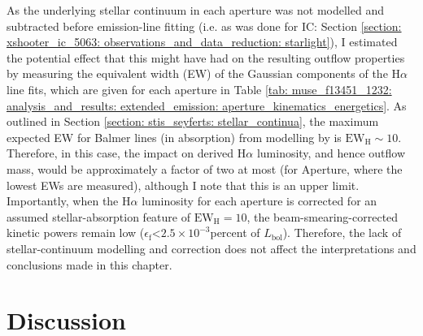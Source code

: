 As the underlying stellar continuum in each aperture was not modelled and subtracted before emission-line fitting (i.e. as was done for IC: Section \ref{section: xshooter_ic_5063: observations_and_data_reduction: starlight}), I estimated the potential effect that this might have had on the resulting outflow properties by measuring the equivalent width (EW) of the Gaussian components of the H$\alpha$ line fits, which are given for each aperture in Table \ref{tab: muse_f13451_1232: analysis_and_results: extended_emission: aperture_kinematics_energetics}. As outlined in Section \ref{section: stis_seyferts: stellar_continua}, the maximum expected EW for Balmer lines (in absorption) from modelling by \citet{GonzalezDelgado1999} is $\mathrm{EW}_\mathrm{H}\sim10$\;{\AA}. Therefore, in this case, the impact on derived H$\alpha$ luminosity, and hence outflow mass, would be approximately a factor of two at most (for Aperture, where the lowest EWs are measured), although I note that this is an upper limit. Importantly, when the H$\alpha$ luminosity for each aperture is corrected for an assumed stellar-absorption feature of $\mathrm{EW}_\mathrm{H}=10$\;{\AA}, the beam-smearing-corrected kinetic powers remain low ($\epsilon_\mathrm{f}$\;\textless\;$2.5\times10^{-3}$\;per\;cent of $L_\mathrm{bol}$). Therefore, the lack of stellar-continuum modelling and correction does not affect the interpretations and conclusions made in this chapter.

\section{Discussion}
\label{section: muse_f13451_1232: discussion}


